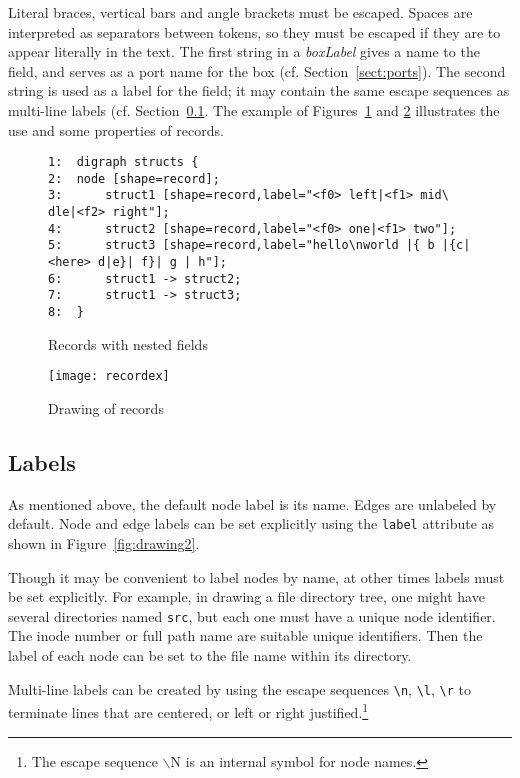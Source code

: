 \documentclass[11pt]{article}
\begin{document}
Literal braces, vertical bars and angle brackets must be escaped. 
Spaces are interpreted as separators between tokens, so they
must be escaped if they are to appear literally in the text.
The first string in a {\it boxLabel} gives a name to the field,
and serves as a port name for the box (cf. Section~\ref{sect:ports}).
The second string is used as a label for the field; 
it may contain the same escape sequences as multi-line 
labels (cf. Section~\ref{sect:labels}.
The example of Figures~\ref{fig:record} and \ref{fig:recorddrawing}
illustrates the use and some properties of records.

\begin{figure}[p]\footnotesize
\begin{verbatim}
1:  digraph structs {
2:  node [shape=record];
3:      struct1 [shape=record,label="<f0> left|<f1> mid\ dle|<f2> right"];
4:      struct2 [shape=record,label="<f0> one|<f1> two"];
5:      struct3 [shape=record,label="hello\nworld |{ b |{c|<here> d|e}| f}| g | h"];
6:      struct1 -> struct2;
7:      struct1 -> struct3;
8:  }
\end{verbatim}
\caption{Records with nested fields}
\label{fig:record}
\end{figure}
\begin{figure}[p]
	\centerline {
		\texttt{[image: recordex]}
	}
    \caption{Drawing of records}
    \label{fig:recorddrawing}
\end{figure}

\subsection{Labels}
\label{sect:labels}

As mentioned above, the default node label is its name.
Edges are unlabeled by default.
Node and edge labels can be set explicitly using the {\tt label}
attribute as shown in 
Figure~\ref{fig:drawing2}.

Though it may be convenient to label nodes by name, at other times
labels must be set explicitly.  For example, in drawing a file
directory tree, one might have several directories named {\tt src},
but each one must have a unique node identifier.
The inode number or full path name are suitable unique identifiers.
Then the label of each node can be set to the file name within
its directory. 

Multi-line labels can be created by using the escape 
sequences \verb"\n", \verb"\l", \verb"\r" to terminate
lines that are centered, or left or right justified.\footnote{The escape
sequence $\backslash$N is an internal symbol for node names.}
\end{document}
